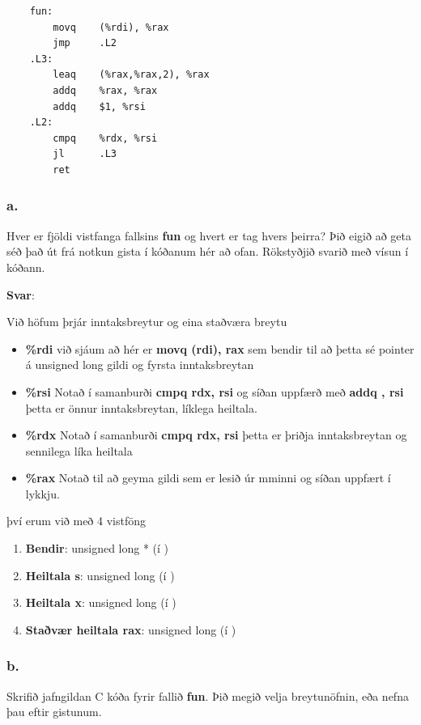 \documentclass{article}
\begin{document}
\begin{verbatim}
    fun:
        movq    (%rdi), %rax
        jmp     .L2
    .L3:
        leaq    (%rax,%rax,2), %rax
        addq    %rax, %rax
        addq    $1, %rsi
    .L2:
        cmpq    %rdx, %rsi
        jl      .L3
        ret
\end{verbatim}


\subsubsection{a.} Hver er fjöldi vistfanga fallsins \textbf{fun} og hvert er tag hvers þeirra? Þið eigið að geta séð það út frá notkun gista í kóðanum hér að ofan. 
Rökstyðjið svarið með vísun í kóðann.


\textbf{Svar}:

Við höfum þrjár inntaksbreytur og eina staðværa breytu

\begin{itemize}
    \item \textbf{\%rdi} við sjáum að hér er \textbf{movq (rdi), rax} sem bendir til að þetta sé pointer á unsigned long gildi og fyrsta inntaksbreytan
    \item \textbf{\%rsi} Notað í samanburði \textbf{cmpq rdx, rsi} og síðan uppfærð með \textbf{addq , rsi} þetta er önnur inntaksbreytan, líklega heiltala.
    \item \textbf{\%rdx} Notað í samanburði \textbf{cmpq rdx, rsi} þetta er þriðja inntaksbreytan og sennilega líka heiltala
    \item \textbf{\%rax} Notað til að geyma gildi sem er lesið úr mminni og síðan uppfært í lykkju.
\end{itemize}

því erum við með 4 vistföng

\begin{enumerate}
    \item \textbf{Bendir}: unsigned long * (í )
    \item \textbf{Heiltala s}: unsigned long (í )
    \item \textbf{Heiltala x}: unsigned long (í )
    \item \textbf{Staðvær heiltala rax}: unsigned long (í )
\end{enumerate}


\subsubsection{b.}Skrifið jafngildan C kóða fyrir fallið \textbf{fun}. Þið megið velja breytunöfnin, eða
nefna þau eftir gistunum.
\end{document}
